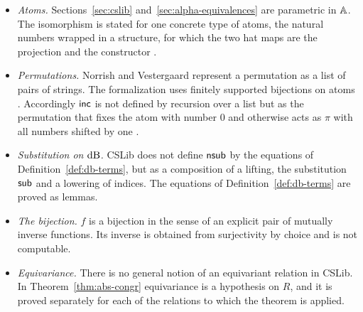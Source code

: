 \begin{itemize}
  \item \emph{Atoms.} Sections~\ref{sec:cslib}
    and~\ref{sec:alpha-equivalences} are parametric in $\mathbb{A}$. The
    isomorphism is stated for one concrete type of atoms, the natural
    numbers wrapped in a structure, for which the two hat maps are the
    projection and the constructor
    .
  \item \emph{Permutations.} Norrish and Vestergaard represent a
    permutation as a list of pairs of strings. The formalization uses
    finitely supported bijections on atoms
    .
    Accordingly $\mathsf{inc}$ is not defined by recursion over a list but as
    the permutation that fixes the atom with number $0$ and otherwise
    acts as $\pi$ with all numbers shifted by one
    .
  \item \emph{Substitution on $\mathrm{dB}$.} CSLib does not define $\mathsf{nsub}$
    by the equations of Definition~\ref{def:db-terms}, but as a
    composition of a lifting, the substitution $\mathsf{sub}$ and a lowering
    of indices. The equations of Definition~\ref{def:db-terms} are
    proved as lemmas.
  \item \emph{The bijection.} $f$ is a bijection in the sense of an
    explicit pair of mutually inverse functions. Its inverse is
    obtained from surjectivity by choice and is not computable.
  \item \emph{Equivariance.} There is no general notion of an
    equivariant relation in CSLib. In
    Theorem~\ref{thm:abs-congr} equivariance is a hypothesis on $R$,
    and it is proved separately for each of the relations to which the
    theorem is applied.
\end{itemize}
